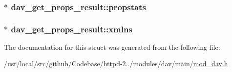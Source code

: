 \subsubsection[{\texorpdfstring{propstats}{propstats}}]{$\ast$ dav\+\_\+get\+\_\+props\+\_\+result\+::propstats}\hypertarget{structdav__get__props__result_a4b85233991b37cb03b36ef1bbf2a277f}{}\label{structdav__get__props__result_a4b85233991b37cb03b36ef1bbf2a277f}
\subsubsection[{\texorpdfstring{xmlns}{xmlns}}]{$\ast$ dav\+\_\+get\+\_\+props\+\_\+result\+::xmlns}\hypertarget{structdav__get__props__result_a1f3c2a589a3a3d3169b8f6cf473fabc8}{}\label{structdav__get__props__result_a1f3c2a589a3a3d3169b8f6cf473fabc8}


The documentation for this struct was generated from the following file\+:\begin{DoxyCompactItemize}
\item 
/usr/local/src/github/\+Codebase/httpd-\/2../modules/dav/main/\hyperlink{mod__dav_8h}{mod\+\_\+dav.\+h}\end{DoxyCompactItemize}
